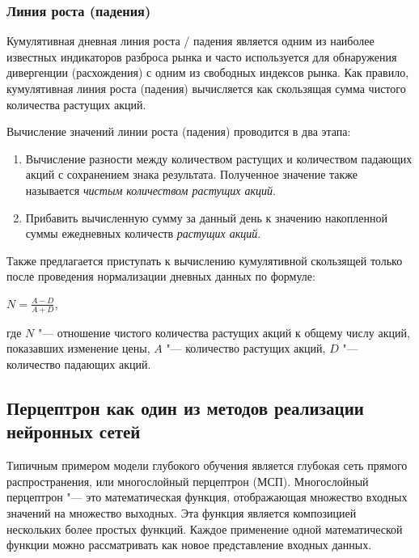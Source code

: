 \documentclass[bachelor, och, coursework]{SCWorks}
\begin{document}
            \subsubsection{Линия роста (падения)}
                Кумулятивная дневная линия роста / падения является одним из
                наиболее известных индикаторов разброса рынка и часто используется
                для обнаружения дивергенции (расхождения) с одним из свободных
                индексов рынка. Как правило, кумулятивная линия роста (падения) вычисляется как
                скользящая сумма чистого количества растущих акций.
                
                Вычисление значений линии роста (падения) проводится в два этапа:
                \begin{enumerate}
                    \item Вычисление разности между количеством растущих и количеством
                    падающих акций с сохранением знака результата. Полученное 
                    значение также называется \textit{чистым количеством растущих акций}.
                    \item Прибавить вычисленную сумму за данный день к значению
                    накопленной суммы ежедневных количеств \textit{растущих акций}.
                \end{enumerate}

                Также предлагается приступать к вычислению кумулятивной скользящей
                только после проведения нормализации дневных данных по формуле:
                \begin{center}
                    $N = \frac{A - D}{A + D} $, 
                \end{center}
                где $N$ "--- отношение чистого количества растущих акций к общему
                числу акций, показавших изменение цены, $A$ "--- количество растущих
                акций, $D$ "--- количество падающих акций.

        \subsection{Перцептрон как один из методов реализации нейронных сетей}
        
        Типичным примером модели глубокого обучения является глубокая сеть прямого 
        распространения, или многослойный перцептрон (МСП). Многослойный перцептрон 
        "--- это математическая функция, отображающая множество входных значений 
        на множество выходных. Эта функция является композицией нескольких
        более простых функций. Каждое применение одной математической функции можно
        рассматривать как новое представление входных данных.
        
\end{document}

